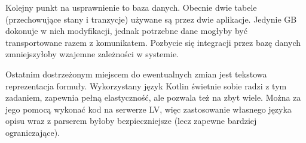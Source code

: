 Kolejny punkt na usprawnienie to baza danych.
Obecnie dwie tabele (przechowujące stany i tranzycje) używane są przez dwie aplikacje.
Jedynie GB dokonuje w nich modyfikacji, jednak potrzebne dane mogłyby być transportowane razem z komunikatem.
Pozbycie się integracji przez bazę danych zmniejszyłoby wzajemne zależności w systemie.

Ostatnim dostrzeżonym miejscem do ewentualnych zmian jest tekstowa reprezentacja formuły.
Wykorzystany język Kotlin świetnie sobie radzi z tym zadaniem, zapewnia pełną elastyczność, ale pozwala też na zbyt wiele.
Można za jego pomocą wykonać kod na serwerze LV, więc zastosowanie własnego języka opisu wraz z parserem byłoby bezpieczniejsze (lecz zapewne bardziej ograniczające).

